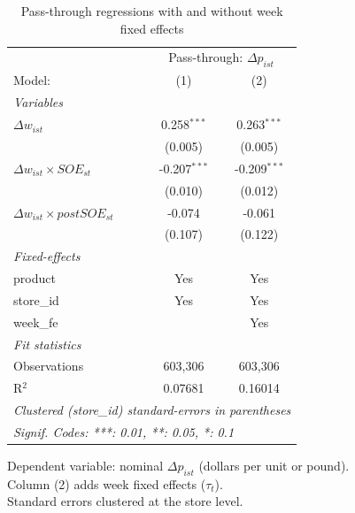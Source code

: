 
\begin{table}[htbp]
   \caption{\label{tab:passthrough_reg} Pass-through regressions with and without week fixed effects}
   \centering
   \begin{tabular}{lcc}
      \tabularnewline \midrule \midrule
       & \multicolumn{2}{c}{Pass-through: $\Delta p_{ist}$} \\ 
      Model:                                 & (1)            & (2)\\  
      \midrule
      \emph{Variables}\\
      $\Delta w_{ist}$                       & 0.258$^{***}$  & 0.263$^{***}$\\   
                                             & (0.005)        & (0.005)\\   
      $\Delta w_{ist} \times SOE_{st}$       & -0.207$^{***}$ & -0.209$^{***}$\\   
                                             & (0.010)        & (0.012)\\   
      $\Delta w_{ist} \times postSOE_{st}$   & -0.074         & -0.061\\   
                                             & (0.107)        & (0.122)\\   
      \midrule
      \emph{Fixed-effects}\\
      product                                & Yes            & Yes\\  
      store\_id                              & Yes            & Yes\\  
      week\_fe                               &                & Yes\\  
      \midrule
      \emph{Fit statistics}\\
      Observations                           & 603,306        & 603,306\\  
      R$^2$                                  & 0.07681        & 0.16014\\  
      \midrule \midrule
      \multicolumn{3}{l}{\emph{Clustered (store\_id) standard-errors in parentheses}}\\
      \multicolumn{3}{l}{\emph{Signif. Codes: ***: 0.01, **: 0.05, *: 0.1}}\\
   \end{tabular}
   
   \par \raggedright 
   Dependent variable: nominal $\Delta p_{ist}$ (dollars per unit or pound).\\
   Column (2) adds week fixed effects ($\tau_t$).\\
   Standard errors clustered at the store level.
\end{table}



